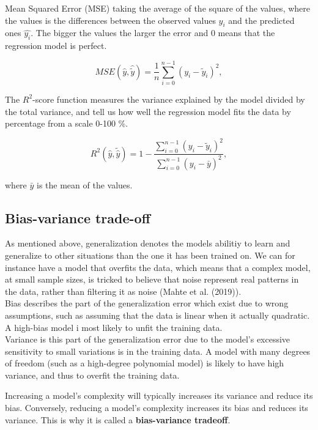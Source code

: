 \documentclass[a4paper]{article}
\begin{document}
Mean Squared Error (MSE) taking the average of the square of the values, where the values is the differences between the observed values $y_i$ and the predicted ones $\hat{y_i}$.  The bigger the values the larger the error and 0 means that the regression model is perfect.

\[ MSE(\hat{y},\hat{\tilde{y}}) = \frac{1}{n}
\sum_{i=0}^{n-1}(y_i-\tilde{y}_i)^2, 
\] 

The $R^{2}$-score function measures the variance explained by the model divided by the total variance, and tell us how well the regression model fits the data by percentage from a scale 0-100 \%.

\[
R^2(\hat{y}, \tilde{\hat{y}}) = 1 - \frac{\sum_{i=0}^{n - 1} (y_i - \tilde{y}_i)^2}{\sum_{i=0}^{n - 1} (y_i - \bar{y})^2},
\]

where $\bar{y}$ is the mean of the values.

\subsection{Bias-variance trade-off}



As mentioned above, generalization denotes the models abilitiy to learn and generalize to other situations than the one it has been trained on. We can for instance have a model that overfits the data, which means that a complex model, at small sample sizes, is tricked to believe that noise represent real patterns in the data, rather than filtering it as noise (Mahte et al. (2019)).\\

Bias describes the part of the generalization error which exist due to wrong assumptions, such as assuming that the data is linear when it actually quadratic. A high-bias model i most likely to unfit the training data. \\
Variance is this part of the generalization error due to the model's excessive sensitivity to small variations is in the training data. A model with many degrees of freedom (such as a high-degree polynomial model) is likely to have high variance, and thus to overfit the training data.

Increasing a model's complexity will typically increases its variance and reduce its bias. Conversely, reducing a model's complexity increases its bias and reduces its variance. This is why it is called a \textbf{bias-variance tradeoff}. \\
\end{document}
